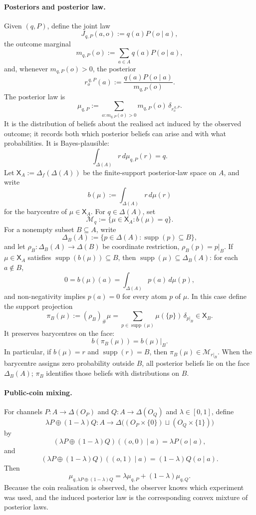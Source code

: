 \documentclass[11pt,a4paper]{article}
\theoremstyle{definition}
\newcommand{\1}{\mathbf 1}
\begin{document}
\paragraph{Posteriors and posterior law.}
Given $(q,P)$, define the joint law
\[
J_{q,P}(a,o):=q(a)P(o\mid a),
\]
the outcome marginal
\[
m_{q,P}(o):=\sum_{a\in A}q(a)P(o\mid a),
\]
and, whenever $m_{q,P}(o)>0$, the posterior
\[
r_o^{\,q,P}(a):=\frac{q(a)P(o\mid a)}{m_{q,P}(o)}.
\]
The posterior law is
\[
\mu_{q,P}:=
\sum_{o:m_{q,P}(o)>0}m_{q,P}(o)\,\delta_{r_o^{\,q,P}}.
\]
It is the distribution of beliefs about the realised act induced by the observed outcome; it records both which posterior
beliefs can arise and with what probabilities.
It is Bayes-plausible:
\[
\int_{\Delta(A)}r\,d\mu_{q,P}(r)=q.
\]
Let $\mathsf X_A:=\Delta_f(\Delta(A))$ be the finite-support posterior-law space on $A$, and write
\[
b(\mu):=\int_{\Delta(A)}r\,d\mu(r)
\]
for the barycentre of $\mu\in\mathsf X_A$.  For $q\in\Delta(A)$, set
\[
\mathcal M_q:=\{\mu\in\mathsf X_A:b(\mu)=q\}.
\]
For a nonempty subset $B\subseteq A$, write
\[
\Delta_B(A):=\{p\in\Delta(A):\operatorname{supp}(p)\subseteq B\},
\]
and let $\rho_B:\Delta_B(A)\to\Delta(B)$ be coordinate restriction, $\rho_B(p)=p|_B$.  If
$\mu\in\mathsf X_A$ satisfies $\operatorname{supp}(b(\mu))\subseteq B$, then
$\operatorname{supp}(\mu)\subseteq\Delta_B(A)$: for each $a\notin B$,
\[
0=b(\mu)(a)=\int_{\Delta(A)}p(a)\,d\mu(p),
\]
and non-negativity implies $p(a)=0$ for every atom $p$ of $\mu$.  In this case define the support projection
\[
\pi_B(\mu):=(\rho_B)_\#\mu
=\sum_{p\in\operatorname{supp}(\mu)}\mu(\{p\})\,\delta_{p|_B}
\in\mathsf X_B.
\]
It preserves barycentres on the face:
\[
b(\pi_B(\mu))=b(\mu)|_B.
\]
In particular, if $b(\mu)=r$ and $\operatorname{supp}(r)=B$, then $\pi_B(\mu)\in\mathcal M_{r|_B}$.
When the barycentre assigns zero probability outside $B$, all posterior beliefs lie on the face $\Delta_B(A)$; $\pi_B$
identifies those beliefs with distributions on $B$.

\paragraph{Public-coin mixing.}
For channels $P:A\to\Delta(O_P)$ and $Q:A\to\Delta(O_Q)$ and $\lambda\in[0,1]$, define
\[
\lambda P\oplus(1-\lambda)Q:
A\to\Delta\bigl((O_P\times\{0\})\sqcup(O_Q\times\{1\})\bigr)
\]
by
\[
(\lambda P\oplus(1-\lambda)Q)((o,0)\mid a)=\lambda P(o\mid a),
\]
and
\[
(\lambda P\oplus(1-\lambda)Q)((o,1)\mid a)=(1-\lambda)Q(o\mid a).
\]
Then
\[
\mu_{q,\lambda P\oplus(1-\lambda)Q}
=
\lambda\mu_{q,P}+(1-\lambda)\mu_{q,Q}.
\]
Because the coin realisation is observed, the observer knows which experiment was used, and the induced posterior law is
the corresponding convex mixture of posterior laws.
\end{document}

